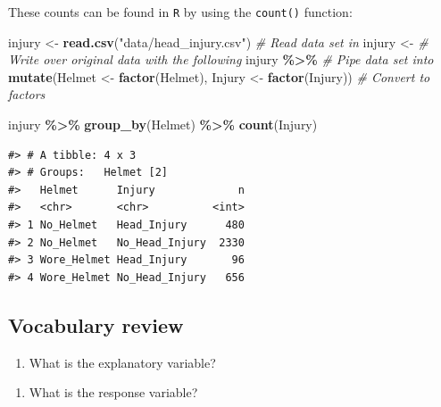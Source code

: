 \documentclass[
]{report}
\newenvironment{Shaded}{\begin{snugshade}}{\end{snugshade}}
\newcommand{\CommentTok}[1]{\textcolor[rgb]{0.56,0.35,0.01}{\textit{#1}}}
\newcommand{\KeywordTok}[1]{\textcolor[rgb]{0.13,0.29,0.53}{\textbf{#1}}}
\newcommand{\NormalTok}[1]{#1}
\newcommand{\OperatorTok}[1]{\textcolor[rgb]{0.81,0.36,0.00}{\textbf{#1}}}
\newcommand{\StringTok}[1]{\textcolor[rgb]{0.31,0.60,0.02}{#1}}
\providecommand{\tightlist}{%
  \setlength{\itemsep}{0pt}\setlength{\parskip}{0pt}}
\begin{document}
These counts can be found in \texttt{R} by using the \texttt{count()} function:

\begin{Shaded}
\begin{Highlighting}[]
\NormalTok{injury \textless{}{-}}\StringTok{ }\KeywordTok{read.csv}\NormalTok{(}\StringTok{"data/head\_injury.csv"}\NormalTok{) }\CommentTok{\# Read data set in}
\NormalTok{injury \textless{}{-}}\StringTok{ }\CommentTok{\# Write over original data with the following}
\StringTok{  }\NormalTok{injury }\OperatorTok{\%\textgreater{}\%}\StringTok{ }\CommentTok{\# Pipe data set into}
\StringTok{  }\KeywordTok{mutate}\NormalTok{(Helmet \textless{}{-}}\StringTok{ }\KeywordTok{factor}\NormalTok{(Helmet),}
\NormalTok{         Injury \textless{}{-}}\StringTok{ }\KeywordTok{factor}\NormalTok{(Injury)) }\CommentTok{\# Convert to factors}

\NormalTok{injury }\OperatorTok{\%\textgreater{}\%}\StringTok{ }\KeywordTok{group\_by}\NormalTok{(Helmet) }\OperatorTok{\%\textgreater{}\%}\StringTok{ }\KeywordTok{count}\NormalTok{(Injury)}
\end{Highlighting}
\end{Shaded}

\begin{verbatim}
#> # A tibble: 4 x 3
#> # Groups:   Helmet [2]
#>   Helmet      Injury             n
#>   <chr>       <chr>          <int>
#> 1 No_Helmet   Head_Injury      480
#> 2 No_Helmet   No_Head_Injury  2330
#> 3 Wore_Helmet Head_Injury       96
#> 4 Wore_Helmet No_Head_Injury   656
\end{verbatim}

\hypertarget{vocabulary-review}{%
\subsection*{Vocabulary review}\label{vocabulary-review}}

\begin{enumerate}
\def\labelenumi{\arabic{enumi}.}
\tightlist
\item
  What is the explanatory variable?
\end{enumerate}

\vspace{0.4in}

\begin{enumerate}
\def\labelenumi{\arabic{enumi}.}
\setcounter{enumi}{1}
\tightlist
\item
  What is the response variable?
\end{enumerate}
\end{document}
